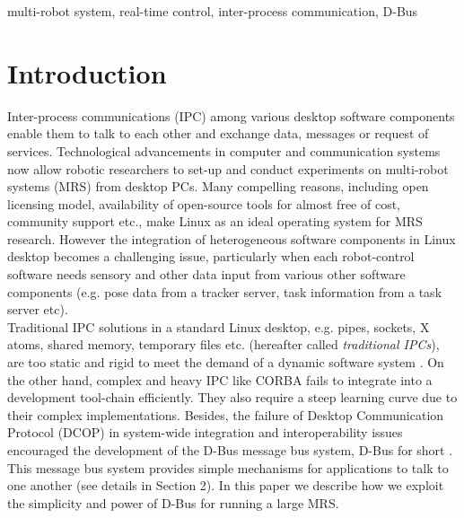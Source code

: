 \documentclass{ifacconf}
\begin{document}
\begin{frontmatter}
\begin{keyword}
multi-robot system, real-time control, inter-process communication, D-Bus
\end{keyword}

\end{frontmatter}
\section{Introduction}
Inter-process communications (IPC) among various desktop software components enable them to talk to each other and exchange data, messages or request of services. Technological advancements in computer and communication systems now allow robotic researchers to set-up and conduct experiments on multi-robot systems (MRS) from desktop PCs. Many compelling reasons, including open licensing model, availability of open-source tools for almost free of cost, community support etc., make Linux as an ideal operating system for MRS research. However the integration of heterogeneous software components in Linux desktop becomes a challenging issue, particularly when each robot-control software needs sensory and other data input from various other software components (e.g. pose data from a tracker server, task information from a task server etc).\\ 
Traditional IPC solutions in a standard Linux desktop, e.g. pipes, sockets, X atoms, shared memory, temporary files etc. (hereafter called {\em traditional IPCs}), are too static and rigid to meet the demand of a dynamic software system \cite{wittenburg2005}. On the other hand, complex and heavy IPC like CORBA fails to integrate into a development tool-chain efficiently. They also require a steep learning curve due to their complex implementations. Besides, the failure of Desktop Communication Protocol (DCOP) in system-wide integration and interoperability issues encouraged the development of the D-Bus message bus system, D-Bus for short \cite{Pennington+2010}. This message bus system provides simple mechanisms for applications to talk to one another (see details in Section 2). In this paper we describe  how we exploit the simplicity and power of D-Bus  for running a large MRS.\\
\end{document}
